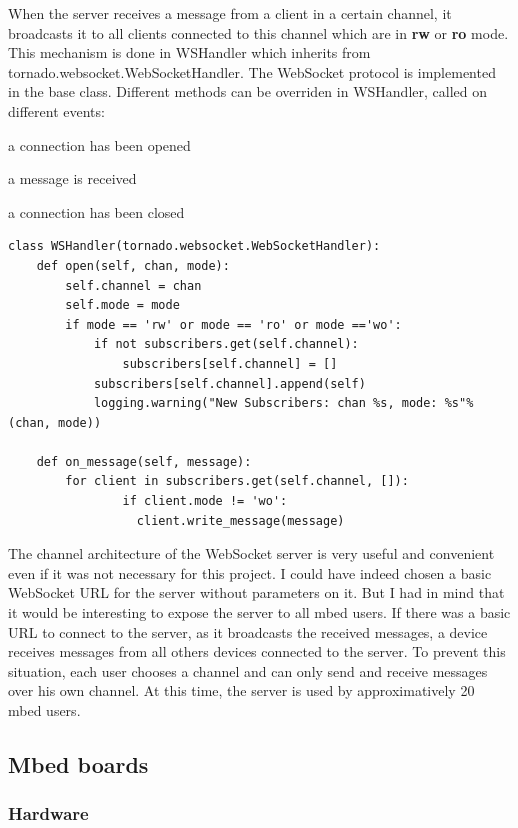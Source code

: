 \documentclass[pdftex,10pt,a4paper]{report}
\newenvironment{packed_item}{
\begin{itemize}
  \setlength{\itemsep}{1pt}
  \setlength{\parskip}{0pt}
  \setlength{\parsep}{0pt}
}{\end{itemize}}
\begin{document}
When the server receives a message from a client in a certain channel, it broadcasts it to all clients connected to this channel which are in \textbf{rw} or \textbf{ro} mode. This mechanism is done in WSHandler which inherits from tornado.websocket.WebSocketHandler. The WebSocket protocol is implemented in the base class. Different methods can be overriden in WSHandler, called on different events:

\begin{packed_item}
	\item a connection has been opened
	\item a message is received
	\item a connection has been closed
\end{packed_item}

\begin{lstlisting}[label=Broadcast messages received,caption=Broadcast messages received]
class WSHandler(tornado.websocket.WebSocketHandler):
    def open(self, chan, mode):
        self.channel = chan
        self.mode = mode
        if mode == 'rw' or mode == 'ro' or mode =='wo':
            if not subscribers.get(self.channel):
                subscribers[self.channel] = []
            subscribers[self.channel].append(self)	
            logging.warning("New Subscribers: chan %s, mode: %s"%(chan, mode))

    def on_message(self, message):
        for client in subscribers.get(self.channel, []):
        		if client.mode != 'wo':
	              client.write_message(message)
\end{lstlisting}

The channel architecture of the WebSocket server is very useful and convenient even if it was not necessary for this project. I could have indeed chosen a basic WebSocket URL for the server without parameters on it. But I had in mind that it would be interesting to expose the server to all mbed users. If there was a basic URL to connect to the server, as it broadcasts the received messages, a device receives messages from all others devices connected to the server. To prevent this situation, each user chooses a channel and can only send and receive messages over his own channel. At this time, the server is used by approximatively 20 mbed users.


\subsection{Mbed boards}
\subsubsection{Hardware}
\end{document}
